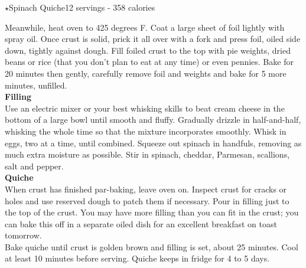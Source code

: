 \begin{recipe}{\texorpdfstring{$\star$}{str}Spinach Quiche}{12 servings - 358 calories}{}
    \newpage

    Meanwhile, heat oven to 425 degrees F. Coat a large sheet of foil lightly with spray oil. Once crust is solid, prick it all over with a fork and press foil, oiled side down, tightly against dough. Fill foiled crust to the top with pie weights, dried beans or rice (that you don’t plan to eat at any time) or even pennies. Bake for 20 minutes then gently, carefully remove foil and weights and bake for 5 more minutes, unfilled.\\

    \textbf{Filling}\\

    Use an electric mixer or your best whisking skills to beat cream cheese in the bottom of a large bowl until smooth and fluffy. Gradually drizzle in half-and-half, whisking the whole time so that the mixture incorporates smoothly. Whisk in eggs, two at a time, until combined. Squeeze out spinach in handfuls, removing as much extra moisture as possible. Stir in spinach, cheddar, Parmesan, scallions, salt and pepper.\\

    \textbf{Quiche}\\

    When crust has finished par-baking, leave oven on. Inspect crust for cracks or holes and use reserved dough to patch them if necessary. Pour in filling just to the top of the crust. You may have more filling than you can fit in the crust; you can bake this off in a separate oiled dish for an excellent breakfast on toast tomorrow.\\

    Bake quiche until crust is golden brown and filling is set, about 25 minutes. Cool at least 10 minutes before serving. Quiche keeps in fridge for 4 to 5 days.

\end{recipe}